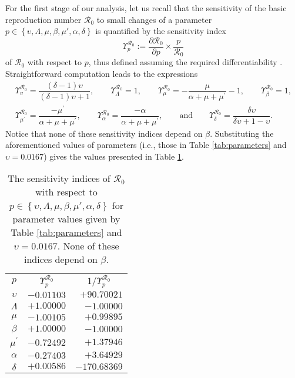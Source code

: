\documentclass[11pt,reqno]{amsart}
\newcommand{\cR}{\mathcal{R}}
\begin{document}
\sloppy For the first stage of our analysis, let us recall that the sensitivity of the basic reproduction number $\cR_{0}$ to small changes of a parameter $p\in\left\{\upsilon,\Lambda,\mu,\beta,\mu',\alpha,\delta\right\}$ is quantified by the sensitivity index
$$\Upsilon _{p}^{\cR_0}:=\frac{\partial \cR
_{0}}{\partial p}\times \frac{p}{\cR
_{0}}$$
of $\cR_{0}$ with respect to $p$, thus defined assuming the required differentiability \cite[page 1280]{ChitnisHymanCushing}. Straightforward computation leads to the expressions
\begin{eqnarray*}
&\Upsilon _{\upsilon }^{\cR_0} =\dfrac{(\delta -1)\upsilon }{(\delta
-1)\upsilon +1},\qquad
\Upsilon _{\Lambda }^{\cR_0} =1,\qquad
\Upsilon _{\mu }^{\cR_0} =-\dfrac{\mu }{\alpha +\mu +\mu ^{\prime }}-1,\qquad\Upsilon _{\beta }^{\cR_0} =1,&\\
&\Upsilon _{\mu ^{\prime }}^{\cR_0} = \dfrac{-\mu ^{\prime }}{\alpha +\mu +\mu ^{\prime }},\qquad\Upsilon _{\alpha }^{\cR_0} =\dfrac{-\alpha }{\alpha +\mu +\mu ^{\prime }},\qquad\text{and}\qquad\Upsilon _{\delta }^{\cR_0} =\dfrac{\delta \upsilon }{\delta \upsilon
+1-\upsilon }.&
\end{eqnarray*}
Notice that none of these sensitivity indices depend on $\beta$. Substituting the aforementioned values of parameters (i.e., those in Table \ref{tab:parameters} and $\upsilon=0.0167$) gives the values presented in Table \ref{tab:sensitivityparameters}.

\begin{table}\renewcommand{\arraystretch}{1.2}
\begin{tabular}{|c|r|r|}\hline
$p$ & \multicolumn{1}{c|}{$\Upsilon _{p}^{\cR_0}$} & \multicolumn{1}{c|}{$1/\Upsilon _{p}^{\cR_0}$} \\\hhline{|=|=|=|}
$\upsilon $ & $-0.01103$ & $+90.70021$ \\ \hline
$\Lambda $ & $+1.00000$ & $-1.00000$ \\ \hline
$\mu $ & $-1.00105$ & $+0.99895$ \\ \hline
$\beta $ & $+1.00000$ & $-1.00000$ \\ \hline
$\mu ^{\prime }$ & $-0.72492$ & $+1.37946$ \\ \hline
$\alpha $ & $-0.27403$ & $+3.64929$ \\ \hline
$\delta $ & $+0.00586$ & $-170.68369$\\\hline
\end{tabular}\smallskip
\caption{\label{tab:sensitivityparameters}The sensitivity indices of $\cR_0$ with respect to $p\in\left\{\upsilon,\Lambda,\mu,\beta,\mu',\alpha,\delta\right\}$ for parameter values given by Table \ref{tab:parameters} and $\upsilon=0.0167$. None of these indices depend on $\beta$.}
\end{table}
\end{document}
